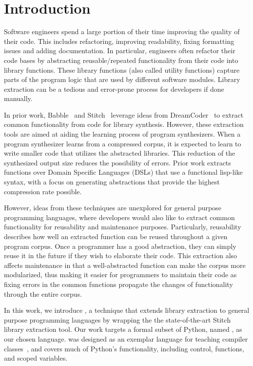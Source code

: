 \section{Introduction}
\label{intro}
Software engineers spend a large portion of their time improving the quality of their code. This includes refactoring, improving readability, fixing formatting issues and adding documentation. In particular, engineers often refactor their code bases by abstracting reusable/repeated functionality from their code into library functions. These library functions (also called utility functions) capture parts of the program logic that are used by different software modules. 
Library extraction can be a tedious and error-prone process for developers if done manually. 

In prior work, Babble~\cite{Cao_2023babble} and Stitch~\cite{Bowers_2023stitch} leverage ideas from DreamCoder~\cite{ellis2020dreamcoder} to extract common functionality from code for library synthesis. However, these extraction tools are aimed at aiding the learning process of program synthesizers. When a program synthesizer learns from a compressed corpus, it is expected to learn to write smaller code that utilizes the abstracted libraries. This reduction of the synthesized output size reduces the possibility of errors. Prior work extracts functions over Domain Specific Languages (DSLs) that use a functional lisp-like syntax, with a focus on generating abstractions that provide the highest compression rate possible.

However, ideas from these techniques are unexplored for general purpose programming languages, where developers would also like to extract common functionality for reusability and maintenance purposes. Particularly, reusability describes how well an extracted function can be reused throughout a given program corpus. Once a programmer has a good abstraction, they can simply reuse it in the future if they wish to elaborate their code. This extraction also affects maintenance in that a well-abstracted function can make the corpus more modularized, thus making it easier for programmers to maintain their code as fixing errors in the common functions propagate the changes of functionality through the entire corpus. 

In this work, we introduce \toolname, a technique that extends library extraction to general purpose programming languages by wrapping the the state-of-the-art Stitch~\cite{Bowers_2023stitch} library extraction tool. Our work targets a formal subset of Python, named \ptwo{}, as our chosen language.  \ptwo{} was designed as an exemplar language for teaching compiler classes~\cite{pythonbook}, and covers much of Python's functionality, including control, functions, and scoped variables. 


